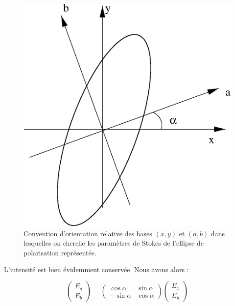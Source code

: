 \documentclass[a4paper,10pt]{article}
\begin{document}
\begin{figure}
\begin{center}
\includegraphics[scale=0.35,angle=0]{change_orient.eps}
\caption{\footnotesize Convention d'orientation relative des bases
$(x, y)$ et $(a, b)$ dans lesquelles on cherche les param\`etres
de Stokes de l'ellipse de polarisation repr\'esent\'ee.}
\label{change_orientation}
\end{center}
\end{figure}

L'intensit\'e est bien \'evidemment conserv\'ee. Nous avons alors
:

\begin{equation}
\left(\begin{array}{c}
E_a \\
E_b\end{array}\right) =\left(\begin{array}{rc}
\cos\alpha & \sin\alpha \\
-\sin\alpha & \cos\alpha \end{array}\right) \left(\begin{array}{c}
E_x \\
E_y\end{array}\right)
\label{eq:rot_basis_jones}
\end{equation}
\end{document}
